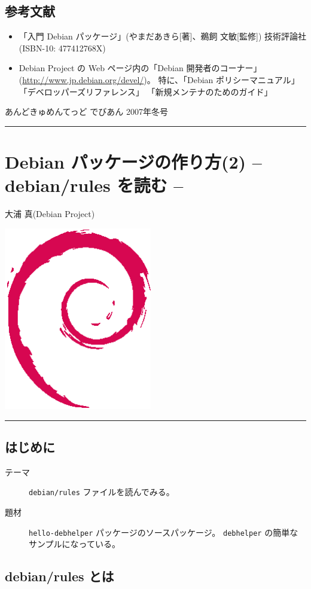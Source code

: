 \documentclass[mingoth,a4paper]{jsarticle}
\renewcommand{\dancersection}[2]{%
\newpage
あんどきゅめんてっど でびあん 2007年冬号
%
\vspace{0.1mm}\\
{\color{dancerlightblue}\rule{\hsize}{2mm}}

%
%
\begin{minipage}[t]{0.7\hsize}
\color{dancerdarkblue}
\vspace{1cm}
\section{#1}
\hfill{}#2\\
\end{minipage}
\begin{minipage}[t]{0.3\hsize}
\vspace{-2cm}
\hfill{}\includegraphics[height=8cm]{image200502/openlogo-nd.eps}\\
\vspace{-5cm}
\end{minipage}
%
%
{\color{dancerdarkblue}\rule{0.74\hsize}{2mm}}
%
\vspace{2cm}
}
\begin{document}
\subsection{参考文献}

\begin{itemize}
\item 「入門 Debian パッケージ」(やまだあきら[著]、鵜飼 文敏[監修]) 技術評論社
  (ISBN-10: 477412768X)
\item Debian Project の Web ページ内の「Debian 開発者のコーナー」
  (\url{http://www.jp.debian.org/devel/})。
  特に、「Debian ポリシーマニュアル」「デベロッパーズリファレンス」
  「新規メンテナのためのガイド」
\end{itemize}

\dancersection{Debian パッケージの作り方(2) -- debian/rules を読む --}{大浦 真(Debian Project)}

\subsection{はじめに}

\begin{description}
\item[テーマ] \texttt{debian/rules} ファイルを読んでみる。
\item[題材] \texttt{hello-debhelper} パッケージのソースパッケージ。
  \texttt{debhelper} の簡単なサンプルになっている。
\end{description}

\subsection{debian/rules とは}
\end{document}
